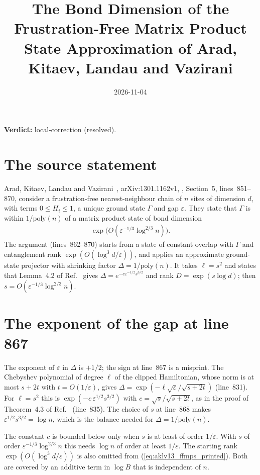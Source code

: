 \documentclass{article}
\title{The Bond Dimension of the Frustration-Free Matrix Product State Approximation of Arad, Kitaev, Landau and Vazirani}
\author{}
\date{2026-11-04}
\providecommand{\gapnote}[2]{\par\noindent\textbf{Verdict:} #1 (#2).\par}
\begin{document}
\maketitle
\gapnote{local-correction}{resolved}

\section{The source statement}

Arad, Kitaev, Landau and Vazirani~\cite{Arad2013AreaLaw},
arXiv:1301.1162v1, , Section~5, lines~851--870,
consider a frustration-free nearest-neighbour chain of $n$ sites of
dimension $d$, with terms $0\le H_i\le1$, a unique ground state $\Gamma$ and
gap $\varepsilon$. They state that $\Gamma$ is within $1/\mathrm{poly}(n)$ of a
matrix product state of bond dimension
\begin{align}
    \exp\bigl(O(\varepsilon^{-1/3}\log^{2/3}n)\bigr).
    \label{eq:aklv13_ffmps_printed}
\end{align}
The argument (lines~862--870) starts from a state of constant overlap with
$\Gamma$ and entanglement rank $\exp(O(\log^3d/\varepsilon))$, and applies an
approximate ground-state projector with shrinking factor
$\Delta=1/\mathrm{poly}(n)$. It takes $\ell=s^2$ and states that Lemma~4.2
of Ref.~\cite{Arad2013AreaLaw} gives $\Delta=e^{-c\varepsilon^{-1/2}s^{3/2}}$ and rank
$D=\exp(s\log d)$; then $s=O(\varepsilon^{-1/3}\log^{2/3}n)$.

\section{The exponent of the gap at line 867}

The exponent of $\varepsilon$ in $\Delta$ is $+1/2$; the sign at line~867 is
a misprint. The Chebyshev polynomial of degree $\ell$ of the clipped
Hamiltonian, whose norm is at most $s+2t$ with $t=O(1/\varepsilon)$, gives
$\Delta=\exp(-\ell\sqrt{\varepsilon}/\sqrt{s+2t})$ (line~831). For $\ell=s^2$
this is $\exp(-c\,\varepsilon^{1/2}s^{3/2})$ with $c=\sqrt{s}/\sqrt{s+2t}$, as
in the proof of Theorem~4.3 of Ref.~\cite{Arad2013AreaLaw} (line~835). The choice of $s$ at
line~868 makes $\varepsilon^{1/2}s^{3/2}=\log n$, which is the balance
needed for $\Delta=1/\mathrm{poly}(n)$.

The constant $c$ is bounded below only when $s$ is at least of order
$1/\varepsilon$. With $s$ of order $\varepsilon^{-1/3}\log^{2/3}n$ this needs
$\log n$ of order at least $1/\varepsilon$. The starting rank
$\exp(O(\log^3d/\varepsilon))$ is also omitted from
(\ref{eq:aklv13_ffmps_printed}). Both are covered by an additive term in
$\log B$ that is independent of $n$.
\end{document}
